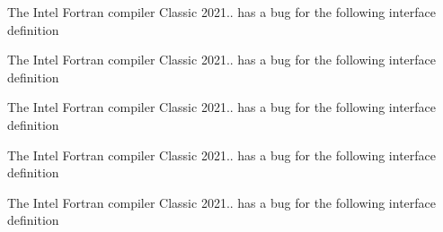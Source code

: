 
\begin{DoxyRefList}
\item[Type \mbox{\hyperlink{interfaceArrayRemap__mod_1_1remap}{Array\+Remap\+\_\+mod\+::remap}} ]\label{bug__bug000001}%
%
 The Intel Fortran compiler Classic 2021.. has a bug for the following interface definition  
\item[Type \mbox{\hyperlink{interfaceArrayReplace__mod_1_1genReplaced}{Array\+Replace\+\_\+mod\+::gen\+Replaced}} ]\label{bug__bug000002}%
%
 The Intel Fortran compiler Classic 2021.. has a bug for the following interface definition  
\item[Type \mbox{\hyperlink{interfaceArrayReplace__mod_1_1getReplaced}{Array\+Replace\+\_\+mod\+::get\+Replaced}} ]\label{bug__bug000003}%
%
 The Intel Fortran compiler Classic 2021.. has a bug for the following interface definition  
\item[Type \mbox{\hyperlink{interfaceArrayUnique__mod_1_1genUnique}{Array\+Unique\+\_\+mod\+::gen\+Unique}} ]\label{bug__bug000004}%
%
 The Intel Fortran compiler Classic 2021.. has a bug for the following interface definition  
\item[Type \mbox{\hyperlink{interfaceArrayUnique__mod_1_1getUnique}{Array\+Unique\+\_\+mod\+::get\+Unique}} ]\label{bug__bug000005}%
%
 The Intel Fortran compiler Classic 2021.. has a bug for the following interface definition 
\end{DoxyRefList}
